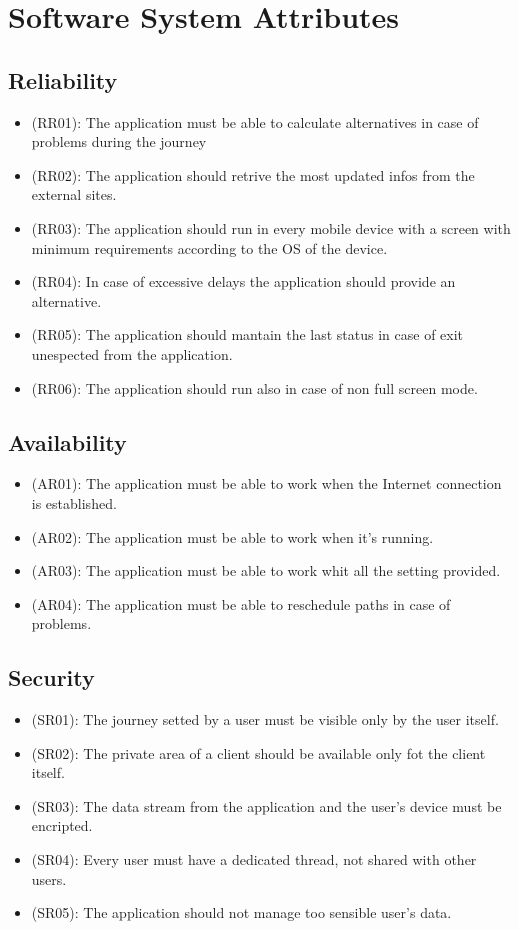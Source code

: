 \documentclass[a4paper,leqno]{book}
\begin{document}
\section{Software System Attributes}

\subsection{Reliability}
\begin{itemize}
\item (RR01): The application must be able to calculate alternatives in case of problems during the journey
\item (RR02): The application should retrive the most updated infos from the external sites.
\item (RR03): The application should run in every mobile device with a screen with minimum requirements according to the OS of the device.
\item (RR04): In case of excessive delays the application should provide an alternative.
\item (RR05): The application should mantain the last status in case of exit unespected from the application.
\item (RR06): The application should run also in case of non full screen mode.
\end{itemize}

\subsection{Availability}
\begin{itemize}
\item (AR01): The application must be able to work when the Internet connection is established.
\item (AR02): The application must be able to work when it's running.
\item (AR03): The application must be able to work whit all the setting provided.
\item (AR04): The application must be able to reschedule paths in case of problems.
\end{itemize}

\subsection{Security}
\begin{itemize}
\item (SR01): The journey setted by a user must be visible only by the user itself.
\item (SR02): The private area of a client should be available only fot the client itself.
\item (SR03): The data stream from the application and the user's device must be encripted.
\item (SR04): Every user must have a dedicated thread, not shared with other users.
\item (SR05): The application should not manage too sensible user's data.
\end{itemize}
\end{document}
